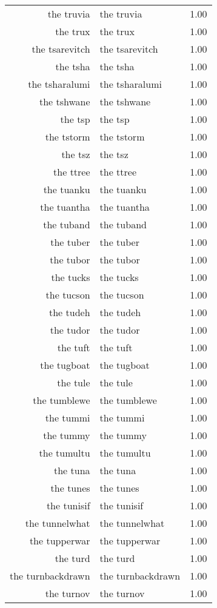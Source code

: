 \begin{table}[ht]
\begin{tabular}{rlr}
  the truvia & the truvia & 1.00 \\ 
  the trux & the trux & 1.00 \\ 
  the tsarevitch & the tsarevitch & 1.00 \\ 
  the tsha & the tsha & 1.00 \\ 
  the tsharalumi & the tsharalumi & 1.00 \\ 
  the tshwane & the tshwane & 1.00 \\ 
  the tsp & the tsp & 1.00 \\ 
  the tstorm & the tstorm & 1.00 \\ 
  the tsz & the tsz & 1.00 \\ 
  the ttree & the ttree & 1.00 \\ 
  the tuanku & the tuanku & 1.00 \\ 
  the tuantha & the tuantha & 1.00 \\ 
  the tuband & the tuband & 1.00 \\ 
  the tuber & the tuber & 1.00 \\ 
  the tubor & the tubor & 1.00 \\ 
  the tucks & the tucks & 1.00 \\ 
  the tucson & the tucson & 1.00 \\ 
  the tudeh & the tudeh & 1.00 \\ 
  the tudor & the tudor & 1.00 \\ 
  the tuft & the tuft & 1.00 \\ 
  the tugboat & the tugboat & 1.00 \\ 
  the tule & the tule & 1.00 \\ 
  the tumblewe & the tumblewe & 1.00 \\ 
  the tummi & the tummi & 1.00 \\ 
  the tummy & the tummy & 1.00 \\ 
  the tumultu & the tumultu & 1.00 \\ 
  the tuna & the tuna & 1.00 \\ 
  the tunes & the tunes & 1.00 \\ 
  the tunisif & the tunisif & 1.00 \\ 
  the tunnelwhat & the tunnelwhat & 1.00 \\ 
  the tupperwar & the tupperwar & 1.00 \\ 
  the turd & the turd & 1.00 \\ 
  the turnbackdrawn & the turnbackdrawn & 1.00 \\ 
  the turnov & the turnov & 1.00 \\ 

\end{tabular}
\end{table}
